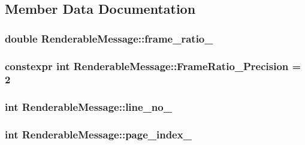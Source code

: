 \subsection{Member Data Documentation}
\hypertarget{classRenderableMessage_a41d8fd1e6b5f8dee768ee227783c6913}{
\subsubsection[{frame\-\_\-ratio\-\_\-}]{\setlength{\rightskip}{0pt plus 5cm}double Renderable\-Message\-::frame\-\_\-ratio\-\_\-\hspace{0.3cm}{\ttfamily [protected]}}}\label{classRenderableMessage_a41d8fd1e6b5f8dee768ee227783c6913}
\hypertarget{classRenderableMessage_af8a50adc6f5e10a890eb435390e4e8a6}{
\subsubsection[{Frame\-Ratio\-\_\-\-Precision}]{\setlength{\rightskip}{0pt plus 5cm}constexpr int Renderable\-Message\-::\-Frame\-Ratio\-\_\-\-Precision = 2\hspace{0.3cm}{\ttfamily [static]}}}\label{classRenderableMessage_af8a50adc6f5e10a890eb435390e4e8a6}
\hypertarget{classRenderableMessage_ae3a742ebe02b5a7f547e97921464e8b5}{
\subsubsection[{line\-\_\-no\-\_\-}]{\setlength{\rightskip}{0pt plus 5cm}int Renderable\-Message\-::line\-\_\-no\-\_\-\hspace{0.3cm}{\ttfamily [protected]}}}\label{classRenderableMessage_ae3a742ebe02b5a7f547e97921464e8b5}
\hypertarget{classRenderableMessage_a1d6dcb391ac3d77b8b38c5e926d58375}{
\subsubsection[{page\-\_\-index\-\_\-}]{\setlength{\rightskip}{0pt plus 5cm}int Renderable\-Message\-::page\-\_\-index\-\_\-\hspace{0.3cm}{\ttfamily [protected]}}}\label{classRenderableMessage_a1d6dcb391ac3d77b8b38c5e926d58375}
